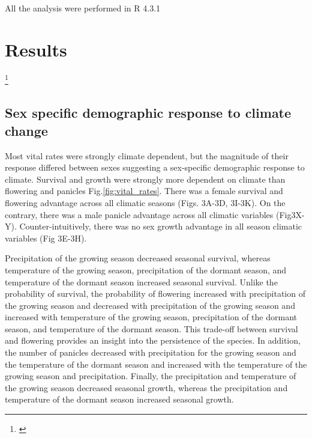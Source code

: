 \documentclass[11pt]{article}\usepackage[]{graphicx}\usepackage[usenames,dvipsnames]{xcolor}
\newcommand{\tom}[2]{{\color{red}{#1}}\footnote{\textit{\color{red}{#2}}}}
\begin{document}
All the analysis were performed in R 4.3.1 \citep{RCoreteam}

\section*{Results}
\tom{}{Since the vital rate results will be updated with the new seasonal covariates I will wait to edit an updated version.}
\subsection*{Sex specific demographic response to climate change}
Most vital rates were strongly climate dependent, but the magnitude of their response differed between sexes suggesting a sex-specific demographic response to climate. 
Survival and growth were strongly more dependent on climate than flowering and panicles Fig.\ref{fig:vital_rates}.
There was a female survival and flowering advantage across all climatic seasons (Figs. 3A-3D, 3I-3K). 
On the contrary, there was a male panicle advantage across all climatic variables (Fig3X-Y). 
Counter-intuitively, there was no sex growth advantage in all season climatic variables (Fig 3E-3H). 

Precipitation of the growing season decreased seasonal survival, whereas temperature of the growing season, precipitation of the dormant season, and temperature of the dormant season increased seasonal survival.
Unlike the probability of survival, the probability of flowering increased with precipitation of the growing season and decreased with precipitation of the growing season and increased with temperature of the growing season, precipitation of the dormant season, and temperature of the dormant season.
This trade-off between survival and flowering provides an insight into the persistence of the species. 
In addition, the number of panicles decreased with precipitation for the growing season and the temperature of the dormant season and increased with the temperature of the growing season and precipitation.
Finally, the precipitation and temperature of the growing season decreased seasonal growth, whereas the precipitation and temperature of the dormant season increased seasonal growth. 
\end{document}
